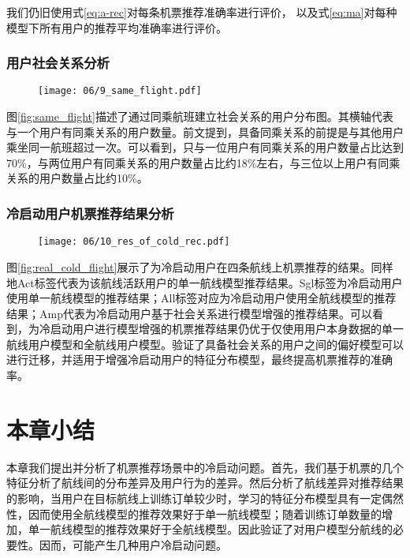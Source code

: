 我们仍旧使用式\ref{eq:a-rec}对每条机票推荐准确率进行评价，
以及式\ref{eq:ma}对每种模型下所有用户的推荐平均准确率进行评价。

\subsubsection{用户社会关系分析}

\begin{figure}
 \centering
 \texttt{[image: 06/9\_same\_flight.pdf]}
\end{figure}

图\ref{fig:same_flight}描述了通过同乘航班建立社会关系的用户分布图。其横轴代表与一个用户有同乘关系的用户数量。前文提到，具备同乘关系的前提是与其他用户乘坐同一航班超过一次。可以看到，只与一位用户有同乘关系的用户数量占比达到70\%，与两位用户有同乘关系的用户数量占比约18\%左右，与三位以上用户有同乘关系的用户数量占比约10\%。

\subsubsection{冷启动用户机票推荐结果分析}

\begin{figure}
 \centering
 \texttt{[image: 06/10\_res\_of\_cold\_rec.pdf]}
\end{figure}

图\ref{fig:real_cold_flight}展示了为冷启动用户在四条航线上机票推荐的结果。同样地Act标签代表为该航线活跃用户的单一航线模型推荐结果。Sgl标签为冷启动用户使用单一航线模型的推荐结果；All标签对应为冷启动用户使用全航线模型的推荐结果；Amp代表为冷启动用户基于社会关系进行模型增强的推荐结果。可以看到，为冷启动用户进行模型增强的机票推荐结果仍优于仅使用用户本身数据的单一航线用户模型和全航线用户模型。验证了具备社会关系的用户之间的偏好模型可以进行迁移，并适用于增强冷启动用户的特征分布模型，最终提高机票推荐的准确率。


\section{本章小结}
本章我们提出并分析了机票推荐场景中的冷启动问题。首先，我们基于机票的几个特征分析了航线间的分布差异及用户行为的差异。然后分析了航线差异对推荐结果的影响，当用户在目标航线上训练订单较少时，学习的特征分布模型具有一定偶然性，因而使用全航线模型的推荐效果好于单一航线模型；随着训练订单数量的增加，单一航线模型的推荐效果好于全航线模型。因此验证了对用户模型分航线的必要性。因而，可能产生几种用户冷启动问题。


